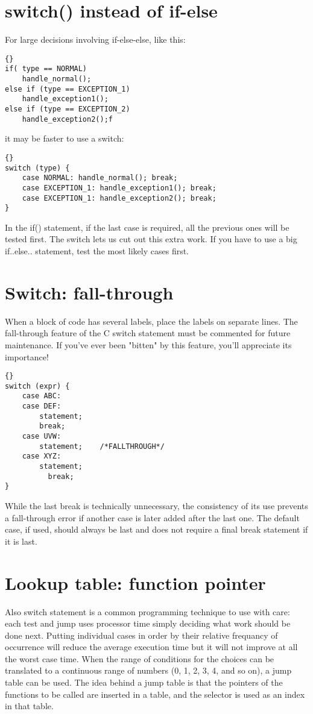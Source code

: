 \documentclass{report}
\begin{document}
\section{switch() instead of if-else}
For large decisions involving if-else-else, like this:
\begin{lstlisting}{}
if( type == NORMAL)
    handle_normal();
else if (type == EXCEPTION_1)
    handle_exception1();
else if (type == EXCEPTION_2)
    handle_exception2();f
\end{lstlisting}
it may be faster to use a switch: 
\begin{lstlisting}{}
switch (type) {
    case NORMAL: handle_normal(); break;
    case EXCEPTION_1: handle_exception1(); break;
    case EXCEPTION_1: handle_exception2(); break;
}
\end{lstlisting}
In the if() statement, if the last case is required, all the previous ones will be tested first. 
The switch lets us cut out this extra work. If you have to use a big if..else.. statement, test the most likely cases first. 


\section{Switch: fall-through}
When a block of code has several labels, place the labels on separate lines. The fall-through feature of the C switch statement must be commented for future maintenance. If you've ever been "bitten" by this feature, you'll appreciate its importance! 
\begin{lstlisting}{}
switch (expr) {
    case ABC:    
    case DEF:
        statement;
        break;
    case UVW:
        statement;    /*FALLTHROUGH*/    
    case XYZ:
        statement;
          break;    
}
\end{lstlisting}
While the last break is technically unnecessary, the consistency of its use prevents a fall-through error if another case is later added after the last one. The default case, if used, should always be last and does not require a final break statement if it is last.


\section{Lookup table: function pointer}
Also switch statement is a common programming technique to use with care: each test and jump uses processor time simply deciding what work should be done next. Putting individual cases in order by their relative frequancy of occurrence will reduce the average execution time but it will not improve at all the worst case time.
When the range of conditions for the choices can be translated to a continuous range of numbers (0, 1, 2, 3, 4, and so on), a jump table can be used. The idea behind a jump table is that the pointers of the functions to be called are inserted in a table, and the selector is used as an index in that table.
\end{document}
